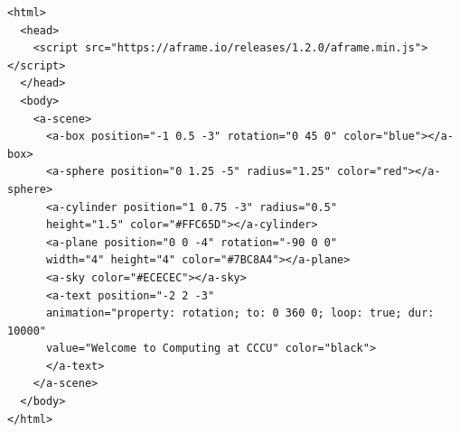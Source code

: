 \begin{lstlisting}
<html>
  <head>
    <script src="https://aframe.io/releases/1.2.0/aframe.min.js"></script>
  </head>
  <body>
    <a-scene>
      <a-box position="-1 0.5 -3" rotation="0 45 0" color="blue"></a-box>
      <a-sphere position="0 1.25 -5" radius="1.25" color="red"></a-sphere>
      <a-cylinder position="1 0.75 -3" radius="0.5"
      height="1.5" color="#FFC65D"></a-cylinder>
      <a-plane position="0 0 -4" rotation="-90 0 0" 
      width="4" height="4" color="#7BC8A4"></a-plane>
      <a-sky color="#ECECEC"></a-sky>
      <a-text position="-2 2 -3" 
      animation="property: rotation; to: 0 360 0; loop: true; dur: 10000" 
      value="Welcome to Computing at CCCU" color="black">
      </a-text>
    </a-scene>
  </body>
</html>
\end{lstlisting}



